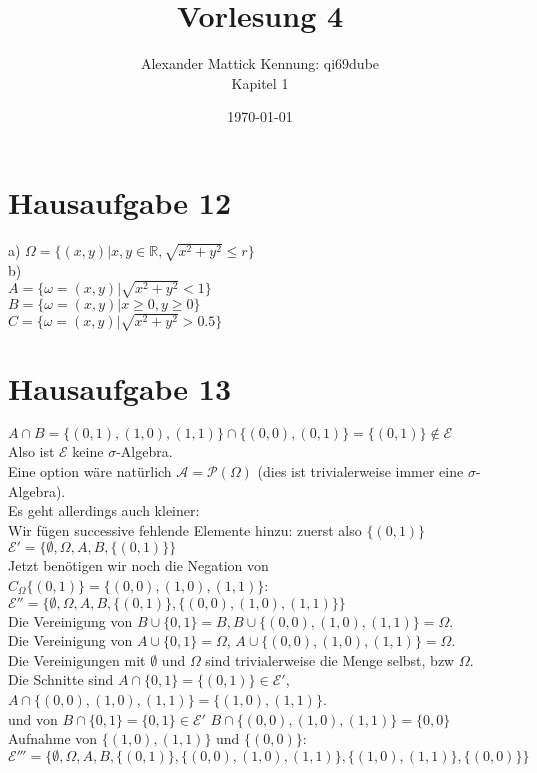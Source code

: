 \documentclass{article}
\author{
Alexander Mattick Kennung: qi69dube\\
Kapitel 1
}
\date{\today}
\title{Vorlesung 4}
\begin{document}
	\maketitle
	\section{Hausaufgabe 12}
	a) $\Omega = \{(x,y)|x,y\in \mathbb{R},\sqrt{ x^2+y^2}\leq r\}$\\
	b) \\
	$A=\{\omega=(x,y)|\sqrt{x^2+y^2}<1\}$\\
	$B=\{\omega=(x,y)|x\geq 0, y\geq 0\}$\\
	$C=\{\omega=(x,y)|\sqrt{x^2+y^2}>0.5\}$
	\section{Hausaufgabe 13}
	$A\cap B= \{(0,1),(1,0),(1,1)\}\cap \{(0,0),(0,1)\}=\{(0,1)\}\notin \mathcal{E}$\\
	Also ist $\mathcal{E}$ keine $\sigma$-Algebra.\\
	Eine option wäre natürlich $\mathcal{A} = \mathcal{P}(\Omega)$ (dies ist trivialerweise immer eine $\sigma$-Algebra).\\
	Es geht allerdings auch kleiner:\\
	Wir fügen successive fehlende Elemente hinzu: zuerst also $\{(0,1)\}$\\
	$\mathcal{E}' = \{\emptyset, \Omega, A,B,\{(0,1)\}\}$\\
	Jetzt benötigen wir noch die Negation von $C_\Omega \{(0,1)\} = \{(0,0),(1,0),(1,1)\}$:\\
	$\mathcal{E}'' = \{\emptyset, \Omega, A,B,\{(0,1)\}, \{(0,0),(1,0),(1,1)\}\}$\\
	Die Vereinigung von $B\cup\{0,1\}=B, B\cup\{(0,0),(1,0),(1,1)\}=\Omega$.\\
	Die Vereinigung von $A\cup\{0,1\}=\Omega$, $A\cup\{(0,0),(1,0),(1,1)\}=\Omega$.\\
	Die Vereinigungen mit $\emptyset$ und $\Omega$ sind trivialerweise die Menge selbst, bzw $\Omega$.\\
	Die Schnitte sind $A\cap\{0,1\}=\{(0,1)\}\in\mathcal{E}'$, $A\cap\{(0,0),(1,0),(1,1)\}=\{(1,0),(1,1)\}$.\\
	und von $B\cap\{0,1\}=\{0,1\}\in\mathcal{E}'$ $B\cap\{(0,0),(1,0),(1,1)\}=\{0,0\}$\\
	Aufnahme von $\{(1,0),(1,1)\}$ und $\{(0,0)\}$:\\
	\[\mathcal{E}''' = \{\emptyset, \Omega, A,B,\{(0,1)\}, \{(0,0),(1,0),(1,1)\},\{(1,0),(1,1)\},\{(0,0)\}\}\]\\
\end{document}
